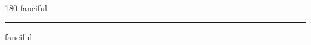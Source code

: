 
\begin{frame}
\begin{center}
\begin{turn}{180}
{\fontsize{2.5cm}{1em}\selectfont fanciful}
\end{turn}
\vspace{1em}\par  
\hrule
\vspace{1em}\par  
{\fontsize{2.5cm}{1em}\selectfont fanciful}
\end{center}
\end{frame}

